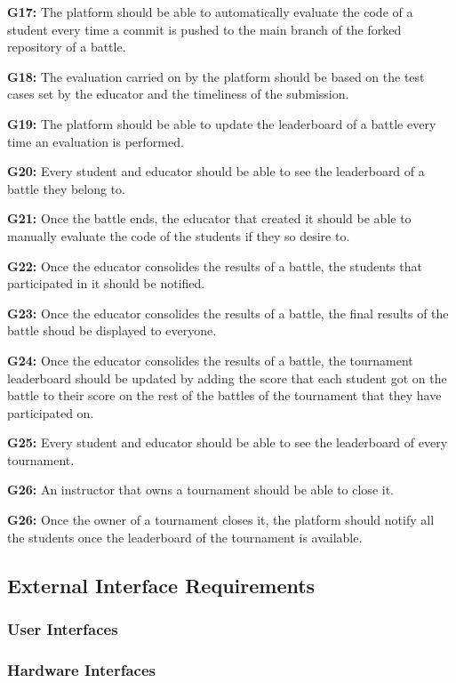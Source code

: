 \documentclass{article}
\begin{document}
    \item \textbf{G17:} The platform should be able to automatically evaluate the code of a student every time a commit is pushed to the main branch of the forked repository of a battle.
    \item \textbf{G18:} The evaluation carried on by the platform should be based on the test cases set by the educator and the timeliness of the submission.
    \item \textbf{G19:} The platform should be able to update the leaderboard of a battle every time an evaluation is performed. 
    \item \textbf{G20:} Every student and educator should be able to see the leaderboard of a battle they belong to.
    \item \textbf{G21:} Once the battle ends, the educator that created it should be able to manually evaluate the code of the students if they so desire to.
    \item \textbf{G22:} Once the educator consolides the results of a battle, the students that participated in it should be notified.
    \item \textbf{G23:} Once the educator consolides the results of a battle, the final results of the battle shoud be displayed to everyone.
    \item \textbf{G24:} Once the educator consolides the results of a battle, the tournament leaderboard should be updated by adding the score that each student got on the battle to their score on the rest of the battles of the tournament that they have participated on.
    \item \textbf{G25:} Every student and educator should be able to see the leaderboard of every tournament.
    \item \textbf{G26:} An instructor that owns a tournament should be able to close it.
    \item \textbf{G26:} Once the owner of a tournament closes it, the platform should notify all the students once the leaderboard of the tournament is available.
\fi
\subsection{External Interface Requirements}
\subsubsection{User Interfaces}
\subsubsection{Hardware Interfaces}
\end{document}
